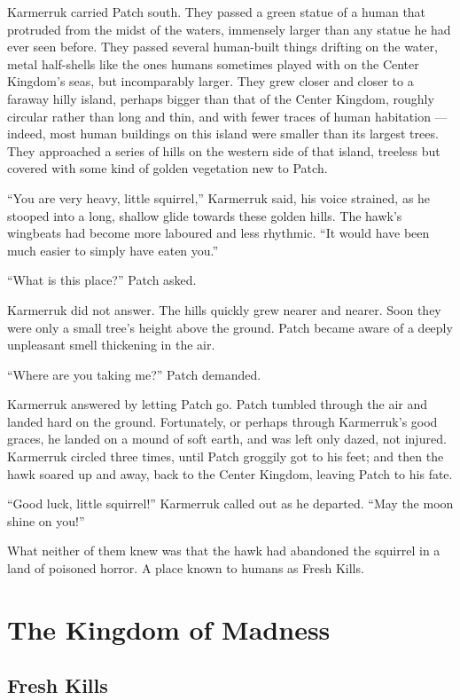 \documentclass[12pt]{memoir}
\begin{document}
Karmerruk carried Patch south. They passed a green statue of a human
that protruded from the midst of the waters, immensely larger than any
statue he had ever seen before. They passed several human-built things
drifting on the water, metal half-shells like the ones humans
sometimes played with on the Center Kingdom’s seas, but incomparably
larger. They grew closer and closer to a faraway hilly island, perhaps
bigger than that of the Center Kingdom, roughly circular rather than
long and thin, and with fewer traces of human habitation — indeed,
most human buildings on this island were smaller than its largest
trees. They approached a series of hills on the western side of that
island, treeless but covered with some kind of golden vegetation new
to Patch.

“You are very heavy, little squirrel,” Karmerruk said, his voice
strained, as he stooped into a long, shallow glide towards these
golden hills. The hawk’s wingbeats had become more laboured and less
rhythmic. “It would have been much easier to simply have eaten you.”

“What is this place?” Patch asked.

Karmerruk did not answer. The hills quickly grew nearer and
nearer. Soon they were only a small tree’s height above the
ground. Patch became aware of a deeply unpleasant smell thickening in
the air.

“Where are you taking me?” Patch demanded.

Karmerruk answered by letting Patch go. Patch tumbled through the air
and landed hard on the ground. Fortunately, or perhaps through
Karmerruk’s good graces, he landed on a mound of soft earth, and was
left only dazed, not injured. Karmerruk circled three times, until
Patch groggily got to his feet; and then the hawk soared up and away,
back to the Center Kingdom, leaving Patch to his fate.

“Good luck, little squirrel!” Karmerruk called out as he
departed. “May the moon shine on you!”

What neither of them knew was that the hawk had abandoned the squirrel
in a land of poisoned horror. A place known to humans as Fresh Kills.



\chapter{The Kingdom of Madness}

\section{Fresh Kills}
\end{document}
